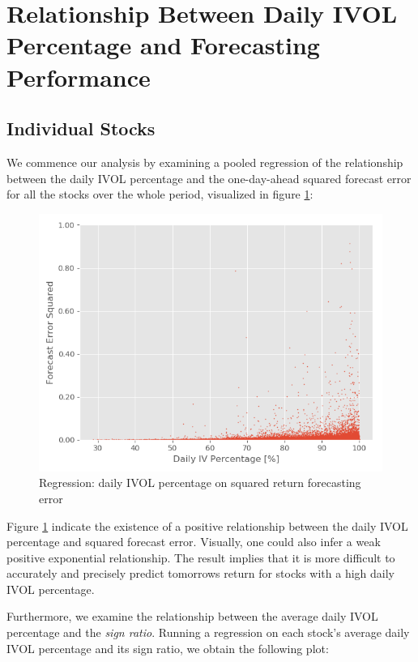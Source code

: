 \section{Relationship Between Daily IVOL Percentage and Forecasting Performance}

\subsection{Individual Stocks}

We commence our analysis by examining a pooled regression of the relationship between the daily IVOL percentage and the one-day-ahead squared forecast error for all the stocks over the whole period, visualized in figure \ref{Scatter regression}: 

\begin{figure}[h]
    \centering
    \includegraphics[scale = 0.5]{Plot/ScatterRegression.png}
    \caption{Regression: daily IVOL percentage on squared return forecasting error}
    \label{Scatter regression}
\end{figure}

Figure \ref{Scatter regression} indicate the existence of a positive relationship between the daily IVOL percentage and squared forecast error. Visually, one could also infer a weak positive exponential relationship. The result implies that it is more difficult to accurately and precisely predict tomorrows return for stocks with a high daily IVOL percentage.

Furthermore, we examine the relationship between the average daily IVOL percentage and the \textit{sign ratio}. Running a regression on each stock's average daily IVOL percentage and its sign ratio, we obtain the following plot: 

